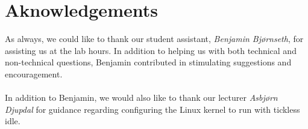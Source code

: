 \section{Aknowledgements}
As always, we could like to thank our student assistant, \emph{Benjamin Bjørnseth}, for assisting us at the lab hours. In addition to helping us with both technical and non-technical questions, Benjamin contributed in stimulating suggestions and encouragement.\\
\\
In addition to Benjamin, we would also like to thank our lecturer \emph{Asbjørn Djupdal} for guidance regarding configuring the Linux kernel to run with tickless idle.
